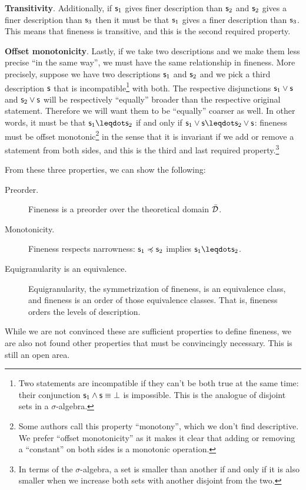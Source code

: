 \documentclass[11pt]{article}
\begin{document}
\textbf{Transitivity}. Additionally, if $\mathsf{s}_1$ gives finer description than $\mathsf{s}_2$ and $\mathsf{s}_2$ gives a finer description than $\mathsf{s}_3$ then it must be that $\mathsf{s}_1$ gives a finer description than $\mathsf{s}_3$. This means that fineness is transitive, and this is the second required property.

\textbf{Offset monotonicity}. Lastly, if we take two descriptions and we make them less precise ``in the same way'', we must have the same relationship in fineness. More precisely, suppose we have two descriptions $\mathsf{s}_1$ and $\mathsf{s}_2$ and we pick a third description $\mathsf{s}$ that is incompatible\footnote{Two statements are incompatible if they can't be both true at the same time: their conjunction $\mathsf{s}_1 \wedge \mathsf{s} \equiv \bot$ is impossible. This is the analogue of disjoint sets in a $\sigma$-algebra.} with both. The respective disjunctions $\mathsf{s}_1 \vee \mathsf{s}$ and $\mathsf{s}_2 \vee \mathsf{s}$ will be respectively ``equally'' broader than the respective original statement. Therefore we will want them to be ``equally'' coarser as well. In other words, it must be that $\stmt_1 \finer \stmt_2$ if and only if $\stmt_1 \OR \stmt \finer \stmt_2 \OR \stmt$: fineness must be offset monotonic\footnote{Some authors call this property ``monotony'', which we don't find descriptive. We prefer ``offset monotonicity'' as it makes it clear that adding or removing a ``constant'' on both sides is a monotonic operation.} in the sense that it is invariant if we add or remove a statement from both sides, and this is the third and last required property.\footnote{In terms of the $\sigma$-algebra, a set is smaller than another if and only if it is also smaller when we increase both sets with another disjoint from the two.}

From these three properties, we can show the following:
\begin{description}
    \item[Preorder.] Fineness is a preorder over the theoretical domain $\bar{\mathcal{D}}$.
    \item[Monotonicity.] Fineness respects narrowness: $\mathsf{s}_1 \preccurlyeq \mathsf{s}_2$ implies $\stmt_1 \finer \stmt_2$.
    \item[Equigranularity is an equivalence.] Equigranularity, the symmetrization of fineness, is an equivalence class, and fineness is an order of those equivalence classes. That is, fineness orders the levels of description.
\end{description}

While we are not convinced these are sufficient properties to define fineness, we are also not found other properties that must be convincingly necessary. This is still an open area.
\end{document}
